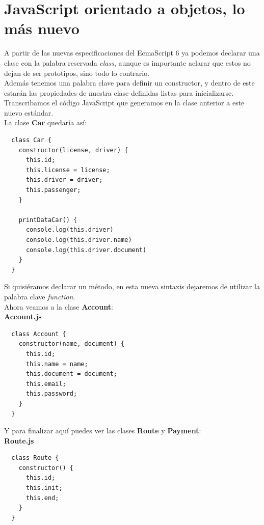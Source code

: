 \documentclass{article}
\begin{document}
\section{JavaScript orientado a objetos, lo más nuevo}%
A partir de las nuevas especificaciones del EcmaScript 6 ya podemos declarar
una clase con la palabra reservada \textit{class}, aunque es importante aclarar
que estos no dejan de ser prototipos, sino todo lo contrario.\\

Además tenemos una palabra clave para definir un constructor, y dentro de este
estarán las propiedades de nuestra clase definidas listas para inicializarse.\\

Transcribamos el código JavaScript que generamos en la clase anterior a este
nuevo estándar.\\

La clase \textbf{Car} quedaría así:

\begin{verbatim}
  class Car {
    constructor(license, driver) {
      this.id;
      this.license = license;
      this.driver = driver;
      this.passenger;
    }

    printDataCar() {
      console.log(this.driver)
      console.log(this.driver.name)
      console.log(this.driver.document)
    }
  }
\end{verbatim}

Si quisiéramos declarar un método, en esta nueva sintaxis dejaremos de utilizar
la palabra clave \textit{function}.\\

Ahora veamos a la clase \textbf{Account}:\\

\textbf{Account.js}
\begin{verbatim}
  class Account {
    constructor(name, document) {
      this.id;
      this.name = name;
      this.document = document;
      this.email;
      this.password;
    }
  }
\end{verbatim}

Y para finalizar aquí puedes ver las clases \textbf{Route} y \textbf{Payment}:\\

\textbf{Route.js}
\begin{verbatim}
  class Route {
    constructor() {
      this.id;
      this.init;
      this.end;
    }
  }
\end{verbatim}
\end{document}
